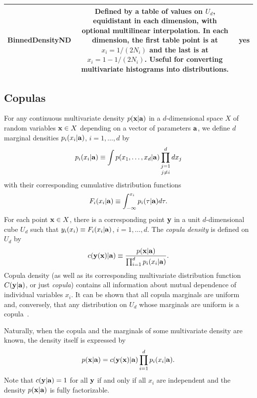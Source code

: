 \documentclass[12pt,titlepage]{article}
\newcommand{\cname}[1]{\index{#1}\textsf{#1}}
\begin{document}
\begin{table}[ht!]
\begin{center}
\begin{tabular}{|c|c|c|}
\cname{BinnedDensityND} & \begin{minipage}{0.52\linewidth}
                      \vskip1mm
                      Defined by a table of values
                      on $U_d$, equidistant in each dimension,
                      with optional multilinear
                      interpolation. In each dimension,
                      the first table point is at
                      $x_i = 1/(2 N_i)$ and the last is at
                      $x_i = 1 - 1/(2 N_i)$.
                      Useful for converting multivariate
                      histograms into distributions.
                      \end{minipage} 
& yes \\ \hline
\end{tabular}
\end{center}
\end{table}


\subsection{Copulas}

For any continuous multivariate density $p({\bf x}|{\bf a})$ 
in a $d$-dimensional space $X$ of random variables ${\bf x} \in X$
depending on a vector of parameters ${\bf a}$,
we define $d$ marginal densities $p_i(x_i|{\bf a})$, $i = 1, \ldots, d$ by
$$
p_i(x_i|{\bf a}) \equiv \int p(x_1, \ldots, x_d |{\bf a}) \mathop{\prod_{j=1}^d}_{j \ne i} d x_j
$$
with their corresponding cumulative distribution functions
$$
F_i(x_i|{\bf a}) \equiv \int_{-\infty}^{x_i} p_i(\tau|{\bf a}) d \tau .
$$
For each point ${\bf x} \in X$, there is a corresponding
point ${\bf y}$ in a unit $d$-dimensional
cube $U_d$ such that $y_i(x_i) \equiv F_i(x_i|{\bf a})$, $i = 1, \ldots, d$. The {\it copula density}
is defined on $U_d$ by
\begin{equation}
c({\bf y}({\bf x})|{\bf a}) \equiv \frac{p({\bf x}|{\bf a})}{\prod_{i=1}^{d} p_i(x_i|{\bf a})}.
\label{eq:copuladef}
\end{equation}
Copula density (as well as its corresponding multivariate
distribution function $C({\bf y}|{\bf a})$, or just {\it copula})
contains all information
about mutual dependence of individual variables $x_i$.
It can be shown that all copula marginals are uniform and, conversely,
that any distribution on $U_d$ whose marginals are uniform
is a copula~\cite{ref:copulabook}.

Naturally, when the copula and the marginals of some multivariate density
are known, the density itself is expressed by
\begin{equation}
p({\bf x}|{\bf a}) = c({\bf y}({\bf x})|{\bf a}) \prod_{i=1}^{d} p_i(x_i|{\bf a}).
\end{equation}
Note that $c({\bf y}|{\bf a}) = 1$ for all ${\bf y}$ if and only if all $x_i$
are independent and the density $p({\bf x}|{\bf a})$ is fully
factorizable.
\end{document}
